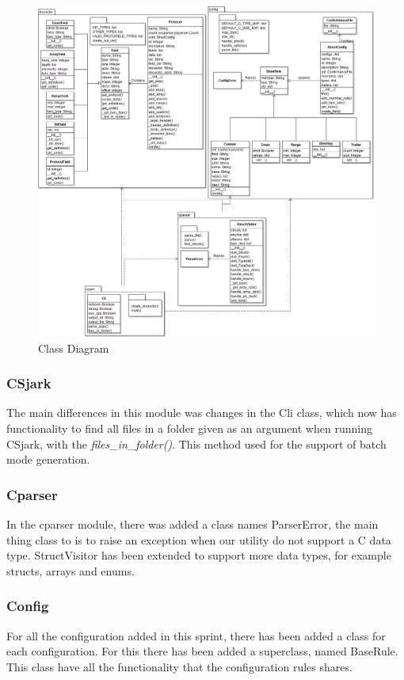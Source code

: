 \begin{figure}[!htb]
	\center
	\includegraphics[width=\textwidth]{./sprints/img/class_diagram_s2}
	\caption{Class Diagram\label{fig:sp2:class}}
\end{figure}

\subsubsection{CSjark}
The main differences in this module was changes in the Cli class, which now 
has functionality to find all files in a folder given as an argument when 
running CSjark, with the \emph{files\_in\_folder()}. This method used for the 
support of batch mode generation.

\subsubsection{Cparser}
In the cparser module, there was added a class names ParserError, the main 
thing class to is to raise an exception when our utility do not support a C 
data type. StructVisitor has been extended to support more data types, for 
example structs, arrays and enums.

\subsubsection{Config}
For all the configuration added in this sprint, there has been added a class 
for each configuration. For this there has been added a superclass, named 
BaseRule. This class have all the functionality that the configuration rules 
shares. 

